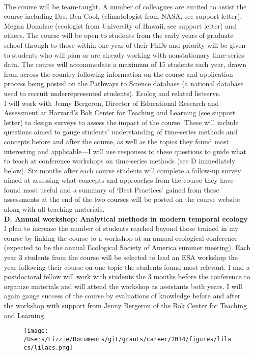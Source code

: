 \documentclass[12pt,a4paper,oneside]{article}
\begin{document}
\vspace{1.5ex}\\
The course will be team-taught. A number of colleagues are excited to assist the course including Drs. Ben Cook (climatologist from NASA, see support letter), Megan Donahue (ecologist from University of Hawaii, see support letter) and others. The course will be open to students from the early years of graduate school through to those within one year of their PhDs and priority will be given to students who will plan or are already working with nonstationary time-series data. The course will accommodate a maximum of 15 students each year, drawn from across the country following information on the course and application process being posted on the Pathways to Science database (a national database used to recruit underrepresented students), Ecolog and related listservs. 
\vspace{1.5ex}\\
I will work with Jenny Bergeron, Director of Educational Research and Assessment at Harvard's Bok Center for Teaching and Learning (see support letter) to design surveys to assess the impact of the course. These will include questions aimed to gauge students' understanding of time-series methods and concepts before and after the course, as well as the topics they found most interesting and applicable---I will use responses to these questions to guide what to teach at conference workshops on time-series methods (see D immediately below). Six months after each course students will complete a follow-up survey aimed at assessing what concepts and approaches from the course they have found most useful and a summary of `Best Practices' gained from these assessments at the end of the two courses will be posted on the course website along with all teaching materials. 
\vspace{1.5ex}\\
{\bf D. Annual workshop: Analytical methods in modern temporal ecology}
\vspace{1.5ex}\\
I plan to increase the number of students reached beyond those trained in my course by linking the course to a workshop at an annual ecological conference (expected to be the annual Ecological Society of America summer meeting). Each year 3 students from the course will be selected to lead an ESA workshop the year following their course on one topic the students found most relevant. I and a postdoctoral fellow will work with students the 3 months before the conference to organize materials and will attend the workshop as assistants both years. I will again gauge success of the course by evaluations of knowledge before and after the workshop with support from Jenny Bergeron of the Bok Center for Teaching and Learning.
\vspace{1.5ex}\\
\begin{figure}[h!]
\begin{center}
\texttt{[image: /Users/Lizzie/Documents/git/grants/career/2014/figures/lilacs/lilacs.png]}
\end{center}
\end{figure}
\end{document}
